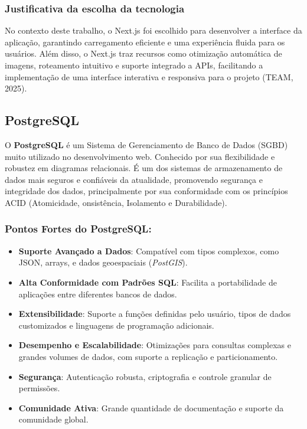 \subsubsection{Justificativa da escolha da tecnologia}
No contexto deste trabalho, o Next.js foi escolhido para desenvolver a interface da aplicação, garantindo carregamento eficiente e uma experiência fluida para os usuários. Além disso, o Next.js traz recursos como otimização automática de imagens, roteamento intuitivo e suporte integrado a APIs, facilitando a implementação de uma interface interativa e responsiva para o projeto (TEAM, 2025). 

\subsection{PostgreSQL}

O \textbf{PostgreSQL} é um Sistema de Gerenciamento de Banco de Dados (SGBD) muito utilizado no desenvolvimento web. Conhecido por sua flexibilidade e robustez em diagramas relacionais. É um dos sistemas de armazenamento de dados mais seguros e confiáveis da atualidade, promovendo segurança e integridade dos dados, principalmente por sua conformidade com os princípios ACID (Atomicidade, onsistência, Isolamento e Durabilidade). 

\subsubsection*{Pontos Fortes do PostgreSQL:}
\begin{itemize}
    \item \textbf{Suporte Avançado a Dados}: Compatível com tipos complexos, como JSON, arrays, e dados geoespaciais (\textit{PostGIS}).
    \item \textbf{Alta Conformidade com Padrões SQL}: Facilita a portabilidade de aplicações entre diferentes bancos de dados.
    \item \textbf{Extensibilidade}: Suporte a funções definidas pelo usuário, tipos de dados customizados e linguagens de programação adicionais.
    \item \textbf{Desempenho e Escalabilidade}: Otimizações para consultas complexas e grandes volumes de dados, com suporte a replicação e particionamento.
    \item \textbf{Segurança}: Autenticação robusta, criptografia e controle granular de permissões.
    \item \textbf{Comunidade Ativa}: Grande quantidade de documentação e suporte da comunidade global.
\end{itemize}

